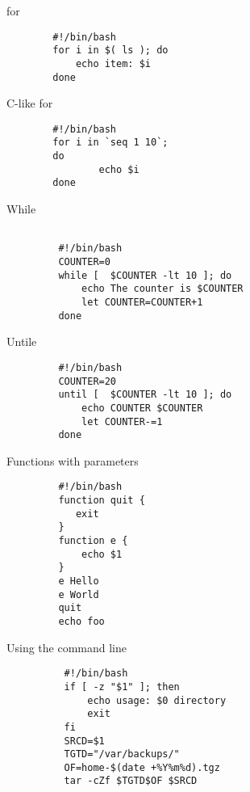 \begin{frame}[containsverbatim]{for}
\begin{lstlisting}
        #!/bin/bash
        for i in $( ls ); do
            echo item: $i
        done
\end{lstlisting}
\end{frame}

\begin{frame}[containsverbatim]{C-like for}
\begin{lstlisting}
        #!/bin/bash
        for i in `seq 1 10`;
        do
                echo $i
        done    
\end{lstlisting}
\end{frame}
        

\begin{frame}[containsverbatim]{While}
\begin{lstlisting}

         #!/bin/bash 
         COUNTER=0
         while [  $COUNTER -lt 10 ]; do
             echo The counter is $COUNTER
             let COUNTER=COUNTER+1 
         done
\end{lstlisting}
\end{frame}
         
\begin{frame}[containsverbatim]{Untile}
\begin{lstlisting}
         #!/bin/bash 
         COUNTER=20
         until [  $COUNTER -lt 10 ]; do
             echo COUNTER $COUNTER
             let COUNTER-=1
         done
\end{lstlisting}
\end{frame}


\begin{frame}[containsverbatim]{Functions with parameters}
\begin{lstlisting}
         #!/bin/bash 
         function quit {
            exit
         }  
         function e {
             echo $1 
         }  
         e Hello
         e World
         quit
         echo foo 
\end{lstlisting}
\end{frame}


\begin{frame}[containsverbatim]{Using the command line}
\begin{lstlisting}
          #!/bin/bash        
          if [ -z "$1" ]; then 
              echo usage: $0 directory
              exit
          fi
          SRCD=$1
          TGTD="/var/backups/"
          OF=home-$(date +%Y%m%d).tgz
          tar -cZf $TGTD$OF $SRCD
\end{lstlisting}
\end{frame}


